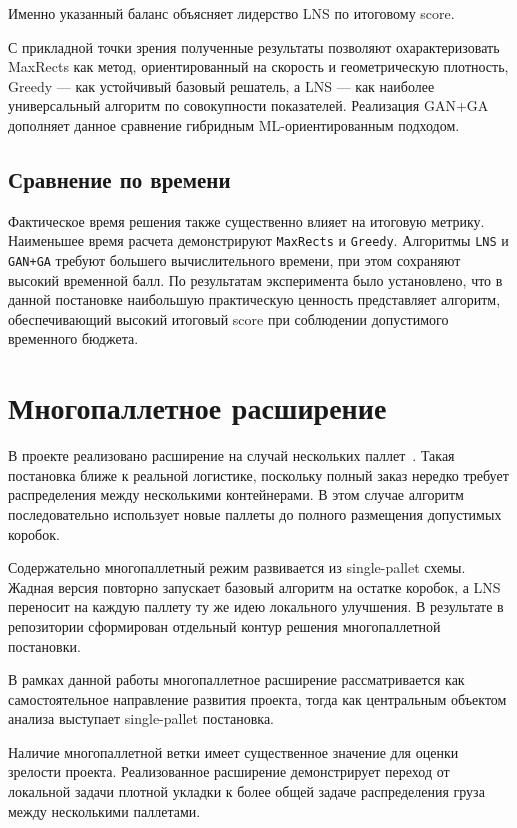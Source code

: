 \documentclass[14pt,a4paper]{extarticle}
\begin{document}
Именно указанный баланс объясняет лидерство LNS по итоговому score.

С прикладной точки зрения полученные результаты позволяют охарактеризовать MaxRects как метод, ориентированный на скорость и геометрическую плотность, Greedy --- как устойчивый базовый решатель, а LNS --- как наиболее универсальный алгоритм по совокупности показателей. Реализация GAN+GA дополняет данное сравнение гибридным ML-ориентированным подходом.

\subsection{Сравнение по времени}

Фактическое время решения также существенно влияет на итоговую метрику. Наименьшее время расчета демонстрируют \texttt{MaxRects} и \texttt{Greedy}. Алгоритмы \texttt{LNS} и \texttt{GAN+GA} требуют большего вычислительного времени, при этом сохраняют высокий временной балл. По результатам эксперимента было установлено, что в данной постановке наибольшую практическую ценность представляет алгоритм, обеспечивающий высокий итоговый score при соблюдении допустимого временного бюджета.

\pagebreak

\section{Многопаллетное расширение}

В проекте реализовано расширение на случай нескольких паллет~\cite{project_repo}. Такая постановка ближе к реальной логистике, поскольку полный заказ нередко требует распределения между несколькими контейнерами. В этом случае алгоритм последовательно использует новые паллеты до полного размещения допустимых коробок.

Содержательно многопаллетный режим развивается из single-pallet схемы. Жадная версия повторно запускает базовый алгоритм на остатке коробок, а LNS переносит на каждую паллету ту же идею локального улучшения. В результате в репозитории сформирован отдельный контур решения многопаллетной постановки.

В рамках данной работы многопаллетное расширение рассматривается как самостоятельное направление развития проекта, тогда как центральным объектом анализа выступает single-pallet постановка.

Наличие многопаллетной ветки имеет существенное значение для оценки зрелости проекта. Реализованное расширение демонстрирует переход от локальной задачи плотной укладки к более общей задаче распределения груза между несколькими паллетами.
\end{document}
